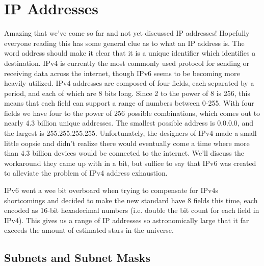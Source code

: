 \documentclass{article}
\begin{document}
\section{IP Addresses}

Amazing that we've come so far and not yet discussed IP addresses! Hopefully everyone reading this has some
general clue as to what an IP address is. The word address should make it clear that it is a unique identifier
which identifies a destination. IPv4 is currently the most commonly used protocol for sending or receiving data
across the internet, though IPv6 seems to be becoming more heavily utilized. IPv4 addresses are composed of
four fields, each separated by a period, and each of which are 8 bits long. Since 2 to the power of 8 is 256,
this means that each field can support a range of numbers between 0-255. With four fields we have four to the
power of 256 possible combinations, which comes out to nearly 4.3 billion unique addresses. The smallest
possible address is 0.0.0.0, and the largest is 255.255.255.255. Unfortunately, the designers of IPv4 made a
small little oopsie and didn't realize there would eventually come a time where more than 4.3 billion devices
would be connected to the internet. We'll discuss the workaround they came up with in a bit, but suffice to
say that IPv6 was created to alleviate the problem of IPv4 address exhaustion.

IPv6 went a wee bit overboard when trying to compensate for IPv4s shortcomings and decided to make the new
standard have 8 fields this time, each encoded as 16-bit hexadecimal numbers (i.e. double the bit count for
each field in IPv4). This gives us a range of IP addresses so astronomically large that it far exceeds the
amount of estimated stars in the universe.

\subsection{Subnets and Subnet Masks}
\end{document}

